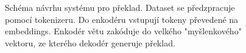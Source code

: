 \begin{figure}[H]
    \begin{center}
    \end{center}
	\caption{Schéma návrhu systému pro překlad. Dataset se předzpracuje pomocí tokenizeru. Do enkodéru vstupují tokeny převedené na embeddings. Enkodér větu zakóduje do velkého "myšlenkového" vektoru, ze kterého dekodér generuje překlad.}
	\label{img:draft}
\end{figure}



